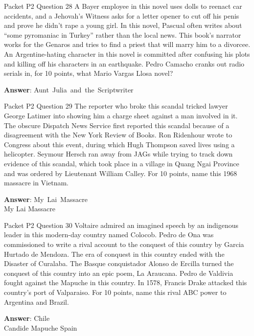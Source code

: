 \begin{frame}{Packet P2 Question 28}
A Bayer employee in this novel uses dolls to reenact car accidents, and a Jehovah's Witness asks for a letter opener to cut off his penis and prove he didn’t rape a young girl. In this novel, Pascual often writes about ``some pyromaniac in Turkey'' rather than the local news. This book’s narrator works for the Genaros and tries to find a priest that will marry him   to a divorcee. An   Argentine-hating character in this novel is committed after confusing his plots and killing off his characters in an earthquake. Pedro Camacho cranks out radio   serials in, for 10 points, what Mario Vargas   Llosa novel?

\textbf{Answer}: Aunt\ Julia\ and\ the\ Scriptwriter\\
\end{frame}

\begin{frame}{Packet P2 Question 29}
The reporter who broke this scandal tricked lawyer George Latimer into showing him a charge sheet against a man involved in it. The obscure Dispatch News Service first reported this scandal because of a disagreement with the New York Review of Books. Ron Ridenhour wrote to Congress about this event, during which Hugh Thompson   saved lives using a helicopter. Seymour   Hersch ran away from JAGs while trying to track down evidence of this scandal, which took place in a village in Quang Ngai Province and was ordered by Lieutenant William Calley.   For 10 points, name this 1968 massacre in Vietnam.  

\textbf{Answer}: My\ Lai\ Massacre\\
 My Lai Massacre
\end{frame}

\begin{frame}{Packet P2 Question 30}
Voltaire admired an imagined   speech by an indigenous leader in this modern-day country named Colocob. Pedro de Ona was commissioned to write a rival account to the conquest of this country by Garcia Hurtado de Mendoza. The era of conquest in this country ended with the Disaster of Curalaba. The Basque conquistador Alonso de Ercilla turned the   conquest of this country into an epic poem, La Araucana.   Pedro de Valdivia fought against the Mapuche in this country. In 1578, Francis Drake attacked this country's port of Valparaiso. For 10 points,   name this rival ABC power to Argentina and Brazil.  

\textbf{Answer}: Chile\\
 Candide
 Mapuche
 Spain
\end{frame}

